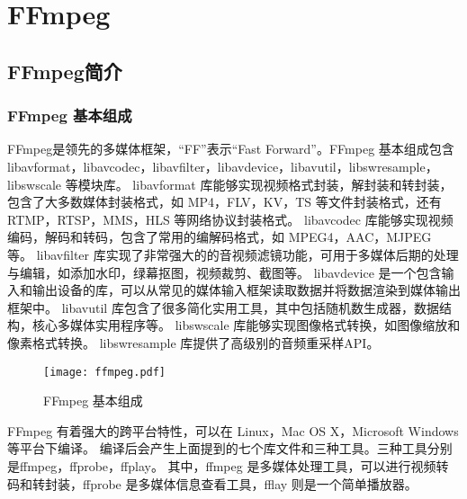
\chapter{FFmpeg}

\section{FFmpeg简介}

\subsection{FFmpeg 基本组成}

FFmpeg是领先的多媒体框架，“FF”表示“Fast Forward”。FFmpeg 基本组成包含 libavformat，libavcodec，libavfilter，libavdevice，libavutil，libswresample，libswscale 等模块库。
libavformat 库能够实现视频格式封装，解封装和转封装，包含了大多数媒体封装格式，如 MP4，FLV，KV，TS 等文件封装格式，还有 RTMP，RTSP，MMS，HLS 等网络协议封装格式。
libavcodec 库能够实现视频编码，解码和转码，包含了常用的编解码格式，如 MPEG4，AAC，MJPEG 等。
libavfilter 库实现了非常强大的的音视频滤镜功能，可用于多媒体后期的处理与编辑，如添加水印，绿幕抠图，视频裁剪、截图等。
libavdevice 是一个包含输入和输出设备的库，可以从常见的媒体输入框架读取数据并将数据渲染到媒体输出框架中。
libavutil 库包含了很多简化实用工具，其中包括随机数生成器，数据结构，核心多媒体实用程序等。
libswscale 库能够实现图像格式转换，如图像缩放和像素格式转换。
libswresample 库提供了高级别的音频重采样API。

\begin{figure}[h]
\centering
\texttt{[image: ffmpeg.pdf]}
\caption{FFmpeg 基本组成}
\label{fig:FFmpeg}
\end{figure}

FFmpeg 有着强大的跨平台特性，可以在 Linux，Mac OS X，Microsoft Windows 等平台下编译。
编译后会产生上面提到的七个库文件和三种工具。三种工具分别是ffmpeg，ffprobe，ffplay。
其中，ffmpeg 是多媒体处理工具，可以进行视频转码和转封装，ffprobe 是多媒体信息查看工具，fflay 则是一个简单播放器。



